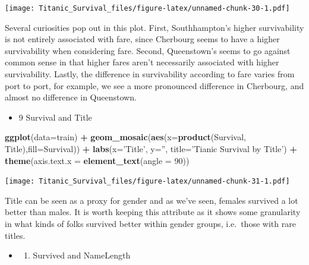 \documentclass[]{article}
\newenvironment{Shaded}{\begin{snugshade}}{\end{snugshade}}
\newcommand{\KeywordTok}[1]{\textcolor[rgb]{0.13,0.29,0.53}{\textbf{#1}}}
\newcommand{\DataTypeTok}[1]{\textcolor[rgb]{0.13,0.29,0.53}{#1}}
\newcommand{\DecValTok}[1]{\textcolor[rgb]{0.00,0.00,0.81}{#1}}
\newcommand{\StringTok}[1]{\textcolor[rgb]{0.31,0.60,0.02}{#1}}
\newcommand{\OperatorTok}[1]{\textcolor[rgb]{0.81,0.36,0.00}{\textbf{#1}}}
\newcommand{\NormalTok}[1]{#1}
\providecommand{\tightlist}{%
  \setlength{\itemsep}{0pt}\setlength{\parskip}{0pt}}
\begin{document}
\texttt{[image: Titanic\_Survival\_files/figure-latex/unnamed-chunk-30-1.pdf]}

Several curiosities pop out in this plot. First, Southhampton's higher
survivability is not entirely associated with fare, since Cherbourg
seems to have a higher survivability when considering fare. Second,
Queenstown's seems to go against common sense in that higher fares
aren't necessarily associated with higher survivability. Lastly, the
difference in survivability according to fare varies from port to port,
for example, we see a more pronounced difference in Cherbourg, and
almost no difference in Queenstown.

\begin{itemize}
\tightlist
\item
  9 Survival and Title
\end{itemize}

\begin{Shaded}
\begin{Highlighting}[]
\KeywordTok{ggplot}\NormalTok{(}\DataTypeTok{data=}\NormalTok{train) }\OperatorTok{+}
\StringTok{   }\KeywordTok{geom_mosaic}\NormalTok{(}\KeywordTok{aes}\NormalTok{(}\DataTypeTok{x=}\KeywordTok{product}\NormalTok{(Survival, Title),}\DataTypeTok{fill=}\NormalTok{Survival)) }\OperatorTok{+}\StringTok{ }
\StringTok{   }\KeywordTok{labs}\NormalTok{(}\DataTypeTok{x=}\StringTok{'Title'}\NormalTok{, }\DataTypeTok{y=}\StringTok{''}\NormalTok{,}
   \DataTypeTok{title=}\StringTok{'Tianic Survival by Title'}\NormalTok{) }\OperatorTok{+}\StringTok{ }
\StringTok{   }\KeywordTok{theme}\NormalTok{(}\DataTypeTok{axis.text.x =} \KeywordTok{element_text}\NormalTok{(}\DataTypeTok{angle =} \DecValTok{90}\NormalTok{))}
\end{Highlighting}
\end{Shaded}

\texttt{[image: Titanic\_Survival\_files/figure-latex/unnamed-chunk-31-1.pdf]}

Title can be seen as a proxy for gender and as we've seen, females
survived a lot better than males. It is worth keeping this attribute as
it shows some granularity in what kinds of folks survived better within
gender groups, i.e.~those with rare titles.

\begin{itemize}
\item
  \begin{enumerate}
  \def\labelenumi{\arabic{enumi}.}
  \setcounter{enumi}{9}
  \tightlist
  \item
    Survived and NameLength
  \end{enumerate}
\end{itemize}
\end{document}

